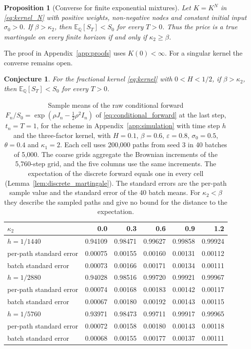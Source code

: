 \documentclass[11pt,a4paper]{article}
\newtheorem{proposition}[theorem]{Proposition}
\newtheorem{conjecture}[theorem]{Conjecture}
\theoremstyle{definition}
\newcommand{\E}{\mathbb{E}}
\newcommand{\Q}{\mathbb{Q}}
\begin{document}
\begin{proposition}[Converse for finite exponential mixtures]\label{prop:finite_converse}
Let $K=K^N$ in \eqref{eq:kernel_N} with positive weights, non-negative nodes and constant initial input $\sigma_0>0$. If $\beta>\kappa_2$, then $\E_\Q[S_T]<S_0$ for every $T>0$. Thus the price is a true martingale on every finite horizon if and only if $\kappa_2\ge\beta$.
\end{proposition}
The proof in Appendix~\ref{app:proofs} uses $K(0)<\infty$. For a singular kernel the converse remains open.

\begin{conjecture}\label{conj:supermartingale}
For the fractional kernel \eqref{eq:kernel} with $0<H<1/2$, if $\beta>\kappa_2$, then $\E_\Q[S_T]<S_0$ for every $T>0$.
\end{conjecture}

\begin{table}[ht]
\centering
\small
\caption{Sample means of the raw conditional forward $F_n/S_0=\exp(\rho J_n-\tfrac12\rho^2I_n)$ of \eqref{eq:conditional_forward} at the last step, $t_n=T=1$, for the scheme in Appendix~\ref{app:simulation} with time step $h$ and the three-factor kernel, with $H=0.1$, $\beta=0.6$, $\varepsilon=0.8$, $\sigma_0=0.5$, $\theta=0.4$ and $\kappa_1=2$. Each cell uses 200,000 paths from seed 3 in 40 batches of 5,000. The coarse grids aggregate the Brownian increments of the 5,760-step grid, and the five columns use the same increments. The expectation of the discrete forward equals one in every cell (Lemma~\ref{lem:discrete_martingale}). The standard errors are the per-path sample value and the standard error of the 40 batch means. For $\kappa_2<\beta$ they describe the sampled paths and give no bound for the distance to the expectation.}\label{tab:martingale}
\begin{tabular}{lrrrrr}
\toprule
$\kappa_2$ & 0.0 & 0.3 & 0.6 & 0.9 & 1.2 \\
\midrule
$h=1/1440$ & 0.94109 & 0.98471 & 0.99627 & 0.99858 & 0.99924 \\
per-path standard error & 0.00075 & 0.00155 & 0.00160 & 0.00131 & 0.00112 \\
batch standard error & 0.00073 & 0.00166 & 0.00171 & 0.00134 & 0.00111 \\
$h=1/2880$ & 0.94028 & 0.98516 & 0.99720 & 0.99921 & 0.99967 \\
per-path standard error & 0.00074 & 0.00168 & 0.00183 & 0.00142 & 0.00117 \\
batch standard error & 0.00067 & 0.00180 & 0.00192 & 0.00143 & 0.00115 \\
$h=1/5760$ & 0.93971 & 0.98473 & 0.99711 & 0.99917 & 0.99965 \\
per-path standard error & 0.00072 & 0.00158 & 0.00180 & 0.00143 & 0.00118 \\
batch standard error & 0.00068 & 0.00155 & 0.00177 & 0.00137 & 0.00111 \\
\bottomrule
\end{tabular}
\end{table}
\end{document}
